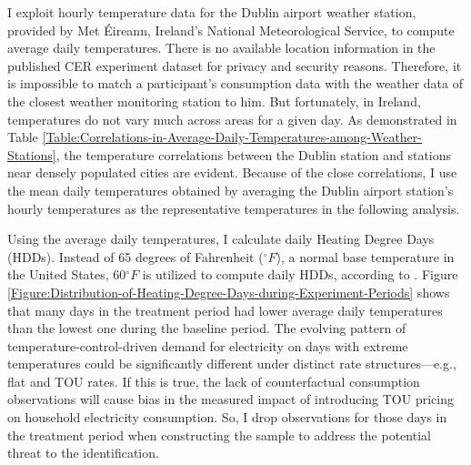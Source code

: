 I exploit hourly temperature data for the Dublin airport weather station, provided by Met \'{E}ireann, Ireland's National Meteorological Service, to compute average daily temperatures. There is no available location information in the published CER experiment dataset for privacy and security reasons. Therefore, it is impossible to match a participant's consumption data with the weather data of the closest weather monitoring station to him. But fortunately, in Ireland, temperatures do not vary much across areas for a given day. As demonstrated in Table \ref{Table:Correlations-in-Average-Daily-Temperatures-among-Weather-Stations}, the temperature correlations between the Dublin station and stations near densely populated cities are evident. Because of the close correlations, I use the mean daily temperatures obtained by averaging the Dublin airport station's hourly temperatures as the representative temperatures in the following analysis. 

Using the average daily temperatures, I calculate daily Heating Degree Days (HDDs). Instead of 65 degrees of Fahrenheit ($^{\circ}F$), a normal base temperature in the United States, 60$^{\circ}F$ is utilized to compute daily HDDs, according to \cite{The-Impacts-of-Climate-Change-on-Domestic-Natural-Gas-Consumption-in-the-Greater-Dublin-Region_Liu-and-Sweeney_2012}. Figure \ref{Figure:Distribution-of-Heating-Degree-Days-during-Experiment-Periods} shows that many days in the treatment period had lower average daily temperatures than the lowest one during the baseline period. The evolving pattern of temperature-control-driven demand for electricity on days with extreme temperatures could be significantly different under distinct rate structures---e.g., flat and TOU rates. If this is true, the lack of counterfactual consumption observations will cause bias in the measured impact of introducing TOU pricing on household electricity consumption. So, I drop observations for those days in the treatment period when constructing the sample to address the potential threat to the identification. 
